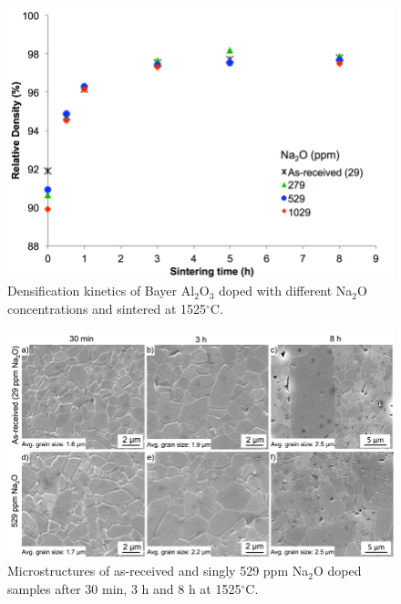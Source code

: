 \newpage
\begin{figure}[H]
	\centering
	\includegraphics[width=\textwidth]{Chapter-3/Figures/Figure3.png}
	\caption{Densification kinetics of Bayer Al$_{2}$O$_{3}$ doped with different Na$_{2}$O concentrations and sintered at 1525$^{\circ}$C.}
	\label{Ch3-figure:Figure3}
\end{figure}

\newpage
\begin{figure}[H]
	\centering
	\includegraphics[width=\textwidth]{Chapter-3/Figures/Figure4.png}
	\caption{Microstructures of as-received and singly 529 ppm Na$_{2}$O doped samples after 30 min, 3 h and 8 h at 1525$^{\circ}$C.}
	\label{Ch3-figure:Figure4}
\end{figure}

